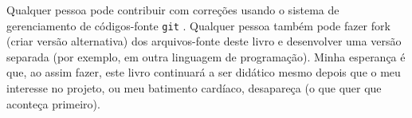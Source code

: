 Qualquer pessoa pode contribuir com correções usando o sistema de gerenciamento
de códigos-fonte \texttt{git}
. Qualquer pessoa também pode fazer fork (criar versão alternativa) dos arquivos-fonte deste livro e desenvolver uma versão separada (por exemplo, em outra linguagem de programação).
Minha esperança é que, ao assim fazer, este livro continuará a
ser didático mesmo depois que o meu interesse no projeto, ou meu batimento cardíaco, desapareça (o que quer que aconteça primeiro).

